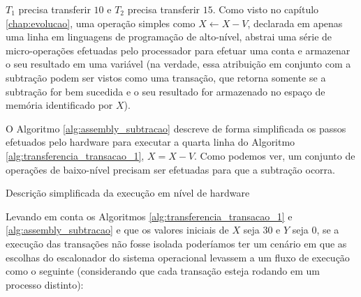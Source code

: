 \documentclass[11pt,twoside,a4paper]{book}
\begin{document}
$T_1$ precisa transferir $10$ e $T_2$ precisa transferir $15$. Como visto no capítulo \ref{chap:evolucao}, uma operação simples como $X \gets X - V$, declarada em apenas uma linha em linguagens de programação de alto-nível, abstrai uma série de micro-operações efetuadas pelo processador para efetuar uma conta e armazenar o seu resultado em uma variável (na verdade, essa atribuição em conjunto com a subtração podem ser vistos como uma transação, que retorna somente se a subtração for bem sucedida e o seu resultado for armazenado no espaço de memória identificado por $X$). 

O Algoritmo \ref{alg:assembly_subtracao} descreve de forma simplificada os passos efetuados pelo hardware para executar a quarta linha do Algoritmo \ref{alg:transferencia_transacao_1}, $X = X - V$. Como podemos ver, um conjunto de operações de baixo-nível precisam ser efetuadas para que a subtração ocorra.

\begin{algorithm}
\caption{Descrição simplificada da execução em nível de hardware}
\label{alg:assembly_subtracao}
\end{algorithm}

Levando em conta os Algoritmos \ref{alg:transferencia_transacao_1} e \ref{alg:assembly_subtracao} e que os valores iniciais de $X$ seja 30 e $Y$ seja 0, se a execução das transações não fosse isolada poderíamos ter um cenário em que as escolhas do escalonador do sistema operacional levassem a um fluxo de execução como o seguinte (considerando que cada transação esteja rodando em um processo distinto):
\end{document}
